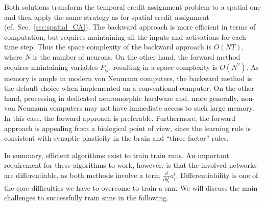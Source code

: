 \documentclass[journal,onecolumn,11pt]{IEEEtran}
\newcommand{\refsec}[1]{{Sec.~\ref{#1}}}
\newcommand{\Dp}[2][]{\frac{\partial #1}{\partial #2}}
\begin{document}
Both solutions transform the temporal credit assignment problem to a spatial one and then apply the same strategy as for spatial credit assignment (cf.\ \refsec{sec:spatial_CA}).
The backward approach is more efficient in terms of computation, but requires maintaining all the inputs and activations for each time step.
Thus the space complexity of the backward approach is $O(N T)$, where $N$ is the number of neurons.
On the other hand, the forward method requires maintaining variables $P_{ij}$, resulting in a space complexity is $O(N^2)$.
As memory is ample in modern von Neumann computers, the backward method is the default choice when implemented on a conventional computer.
On the other hand, processing in dedicated neuromorphic hardware and, more generally, non-von Neumann computers may not have immediate access to such large memory.
In this case, the forward approach is preferable.
Furthermore, the forward approach is appealing from a biological point of view, since the learning rule is consistent with synaptic plasticity in the brain and ``three-factor'' rules.





In summary, efficient algorithms exist to train train \glspl{rnn}.
An important requirement for these algorithms to work, however, is that the involved networks are differentiable, as both methods involve a term $\Dp{y_i^l}{a_i^l}$.
Differentiability is one of the core difficulties we have to overcome to train a \gls{snn}.
We will discuss the main challenges to successfully train \glspl{snn} in the following. 
\end{document}
